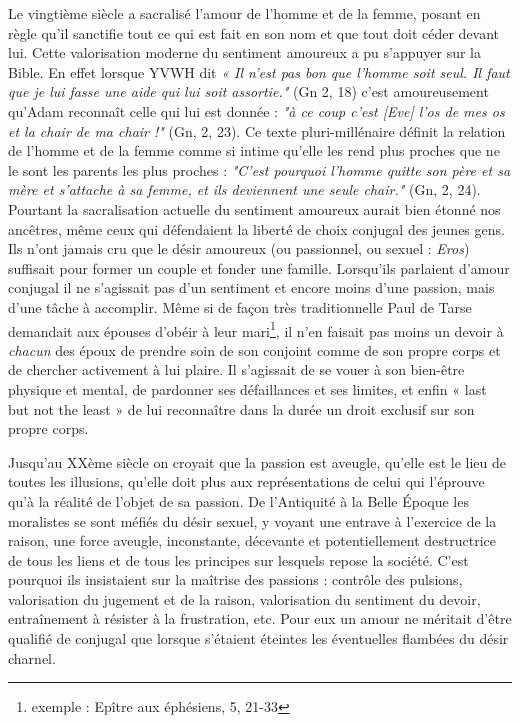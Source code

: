 Le vingtième siècle a sacralisé l’amour de l'homme et de la femme, posant en règle qu'il sanctifie tout ce qui est fait en son nom et que tout doit céder devant lui. Cette  valorisation moderne du sentiment amoureux a pu s'appuyer sur la Bible. En effet lorsque YVWH dit \emph{« Il n'est pas bon que l'homme soit seul. Il faut que je lui fasse une aide qui lui soit assortie."} (Gn 2, 18) c'est amoureusement qu'Adam reconnaît celle qui lui est donnée : \emph{"à ce coup c'est [Eve] l'os de mes os et la chair de ma chair !"} (Gn, 2, 23). Ce texte pluri-millénaire définit la relation de l’homme et de la femme comme si intime qu'elle les rend plus proches que ne le sont les parents les plus proches : \emph{"C'est pourquoi l'homme quitte son père et sa mère et s'attache à sa femme, et ils deviennent une seule chair."} (Gn, 2, 24). Pourtant la sacralisation actuelle du sentiment amoureux aurait bien étonné nos ancêtres, même ceux qui défendaient la liberté de choix conjugal des jeunes gens. Ils n'ont jamais cru  que le désir amoureux (ou passionnel, ou sexuel : \emph{Eros}) suffisait pour former un couple et fonder une famille. Lorsqu'ils parlaient d'amour conjugal il ne s'agissait pas d'un sentiment et encore moins d'une passion, mais d'une tâche à accomplir. Même si de façon très traditionnelle Paul de Tarse demandait aux épouses d'obéir à leur mari\footnote{exemple : Epître aux éphésiens, 5, 21-33}, il n'en faisait pas moins un devoir à \emph{chacun} des époux de prendre soin de son conjoint comme de son propre corps et de chercher activement à lui plaire. Il s'agissait de se vouer à son bien-être physique et mental, de pardonner ses défaillances et ses limites, et enfin « last but not the least » de lui reconnaître dans la durée un droit exclusif sur son propre corps. 
 
 Jusqu'au XXème siècle on croyait que la passion est aveugle, qu'elle est le lieu de toutes les illusions, qu'elle doit plus aux représentations de celui qui l'éprouve qu’à la réalité de l’objet de sa passion. De l'Antiquité à la Belle Époque les moralistes se sont méfiés du désir sexuel, y voyant une entrave à l'exercice de la raison, une force aveugle, inconstante, décevante et potentiellement destructrice de tous les liens et de tous les principes sur lesquels repose la société. C'est pourquoi ils insistaient sur la maîtrise des passions : contrôle des pulsions, valorisation du jugement et de la raison, valorisation du sentiment du devoir, entraînement à résister à la frustration, etc. Pour eux un amour ne méritait d'être qualifié de conjugal que lorsque s'étaient éteintes les éventuelles flambées du désir charnel. 



